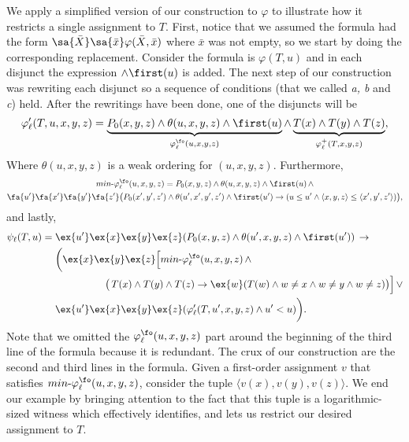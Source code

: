 We apply a simplified version of our construction to $\varphi$ to illustrate how it restricts a single assignment to $T$. First, notice that we assumed the formula had the form $\sa{\bar{X}}\sa{\bar{x}}\varphi(\bar{X},\bar{x})$ where $\bar{x}$ was not empty, so we start by doing the corresponding replacement. Consider the formula is $\varphi(T,u)$ and in each disjunct the expression $\wedge \first(u)$ is added. The next step of our construction was rewriting each disjunct so a sequence of conditions (that we called {\em a, b} and {\em c}) held. After the rewritings have been done, one of the disjuncts will be
\[
\varphi'_{\ell}(T,u,x,y,z) = \underbrace{P_0(x,y,z)\wedge \theta(u,x,y,z)\wedge \first(u)}_{\varphi^{\fo}_{\ell}(u,x,y,z)}\wedge \underbrace{T(x)\wedge T(y)\wedge T(z)}_{\varphi^{+}_{\ell}(T,x,y,z)},
\]
Where $\theta(u,x,y,z)$ is a weak ordering for $(u,x,y,z)$. Furthermore,
\begin{multline*}
\text{$min$-}\varphi^{\fo}_{\ell}(u,x,y,z) = P_0(x,y,z)\wedge \theta(u,x,y,z)\wedge \first(u)\, \wedge \\ \fa{u'}\fa{x'}\fa{y'}\fa{z'}\big(P_0(x',y',z')\wedge \theta(u',x',y',z')\wedge \first(u')\to(u\leq u' \wedge \langle x,y,z\rangle\leq \langle x',y',z'\rangle)\big),
\end{multline*}
and lastly,
\begin{align*}
\psi_{\ell}(T,u) = \; &\ex{u'}\ex{x}\ex{y}\ex{z}(P_0(x,y,z)\wedge \theta(u',x,y,z)\wedge \first(u'))\,\to \\
&\bigg(\ex{x}\ex{y}\ex{z}\Big[\text{$min$-}\varphi^{\fo}_{\ell}(u,x,y,z)\,\wedge \\ 
&\hspace{5em}\big(\,T(x)\wedge T(y)\wedge T(z)\to\ex{w}(T(w)\wedge w \neq x \wedge w\neq y \wedge w\neq z)\big)\Big]\, \vee\\
&\ex{u'}\ex{x}\ex{y}\ex{z}(\varphi'_{\ell}(T,u',x,y,z)\wedge u' < u)\bigg).
\end{align*}
Note that we omitted the $\varphi^{\fo}_{\ell}(u,x,y,z)$ part around the beginning of the third line of the formula because it is redundant. The crux of our construction are the second and third lines in the formula. Given a first-order assignment $v$ that satisfies $\text{$min$-}\varphi^{\fo}_{\ell}(u,x,y,z)$, consider the tuple $\langle v(x),v(y),v(z)\rangle$. We end our example by bringing attention to the fact that this tuple is a logarithmic-sized witness which effectively identifies, and lets us restrict our desired assignment to $T$.
